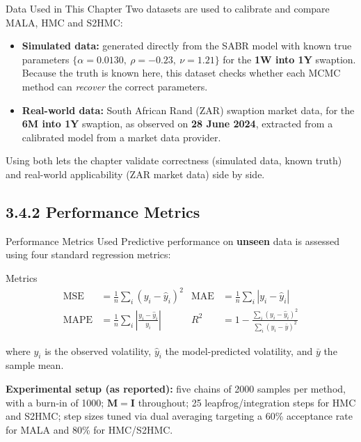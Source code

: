 \documentclass[aspectratio=169,10pt]{beamer}
\begin{document}
\begin{frame}{Data Used in This Chapter}
  Two datasets are used to calibrate and compare MALA, HMC and S2HMC:
  \begin{itemize}
    \item \textbf{Simulated data:} generated directly from the SABR model
      with known true parameters
      $\{\alpha=0.0130,\ \rho=-0.23,\ \nu=1.21\}$
      for the \textbf{1W into 1Y} swaption. Because the truth is known here,
      this dataset checks whether each MCMC method can \emph{recover} the
      correct parameters.
    \item \textbf{Real-world data:} South African Rand (ZAR) swaption market
      data, for the \textbf{6M into 1Y} swaption, as observed on
      \textbf{28 June 2024}, extracted from a calibrated model from a market
      data provider.
  \end{itemize}
  \vspace{2mm}
  Using both lets the chapter validate correctness (simulated data, known
  truth) and real-world applicability (ZAR market data) side by side.
\end{frame}

\subsection{3.4.2 Performance Metrics}

\begin{frame}{Performance Metrics Used}
  Predictive performance on \textbf{unseen} data is assessed using four
  standard regression metrics:
  \begin{block}{Metrics}
  \begin{align*}
    \text{MSE} &= \frac{1}{n}\sum_i (y_i - \hat y_i)^2 &
    \text{MAE} &= \frac{1}{n}\sum_i |y_i - \hat y_i| \\
    \text{MAPE} &= \frac{1}{n}\sum_i \left|\frac{y_i - \hat y_i}{y_i}\right| &
    R^2 &= 1 - \frac{\sum_i (y_i-\hat y_i)^2}{\sum_i (y_i - \bar y)^2}
  \end{align*}
  \end{block}
  where $y_i$ is the observed volatility, $\hat y_i$ the model-predicted
  volatility, and $\bar y$ the sample mean.

  \vspace{2mm}
  \textbf{Experimental setup (as reported):} five chains of 2000 samples per
  method, with a burn-in of 1000; $\mathbf{M}=\mathbf{I}$ throughout; 25
  leapfrog/integration steps for HMC and S2HMC; step sizes tuned via dual
  averaging targeting a 60\% acceptance rate for MALA and 80\% for HMC/S2HMC.
\end{frame}
\end{document}
